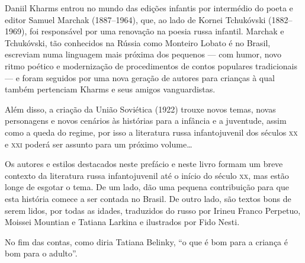 Daniil Kharms entrou no mundo das edições infantis por intermédio do
poeta e editor Samuel Marchak (1887--1964), que, ao lado de Kornei
Tchukóvski (1882--1969), foi responsável por uma renovação na poesia
russa infantil. Marchak e Tchukóvski, tão conhecidos na Rússia como
Monteiro Lobato é no Brasil, escreviam numa linguagem mais próxima dos
pequenos --- com humor, novo ritmo poético e modernização de
procedimentos de contos populares tradicionais --- e foram seguidos por
uma nova geração de autores para crianças à qual também pertenciam
Kharms e seus amigos vanguardistas.

Além disso, a criação da União Soviética (1922) trouxe novos temas,
novas personagens e novos cenários às histórias para a infância e a
juventude, assim como a queda do regime, por isso a literatura russa
infantojuvenil dos séculos \textsc{xx} e \textsc{xxi} poderá ser assunto para um próximo
volume\ldots{}

Os autores e estilos destacados neste prefácio e neste livro formam um
breve contexto da literatura russa infantojuvenil até o início do século
\textsc{xx}, mas estão longe de esgotar o tema. De um lado, dão uma pequena
contribuição para que esta história comece a ser contada no Brasil. De
outro lado, são textos bons de serem lidos, por todas as idades,
traduzidos do russo por Irineu Franco Perpetuo, Moissei Mountian e
Tatiana Larkina e ilustrados por Fido Nesti.

No fim das contas, como diria Tatiana Belinky, ``o que é bom para a
criança é bom para o adulto''.

\endgroup
